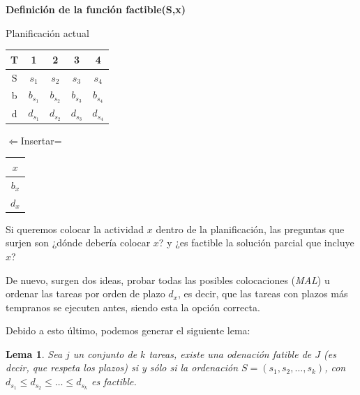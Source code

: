 \documentclass[10pt,a4paper,spanish]{report}
\newtheorem{lem}[thm]{Lema}
\theoremstyle{definition}
\theoremstyle{remark}
\begin{document}
\textbf{Definición de la función factible(S,x)}\\
\begin{minipage}{0.1\textwidth}
Planificación actual
\end{minipage}
\begin{minipage}{0.5\textwidth}
\begin{center}
    \begin{tabular}{|c|c|c|c|c|}
        \hline
        \rowcolor[rgb]{0.8,0.8,0.8}T & 1 & 2 & 3 & 4 \\
        \hline
        \cellcolor[rgb]{0.8,0.8,0.8}S & $s_1$ & $s_2$ & $s_3$ & $s_4$\\
        \hline
        \cellcolor[rgb]{0.9,0.9,0.9}b & $b_{s_1}$ & $b_{s_2}$ & $b_{s_3}$ & $b_{s_4}$\\
        \hline
        \cellcolor[rgb]{0.9,0.9,0.9}d & $d_{s_1}$ & $d_{s_2}$ & $d_{s_3}$ & $d_{s_4}$\\
        \hline
    \end{tabular}
\end{center}
\end{minipage}
\begin{minipage}{0.2\textwidth}
    $\Leftarrow$Insertar=
\end{minipage}
\begin{minipage}{0.2\textwidth}
    \begin{tabular}{|c|}
        \hline
        $x$\\
        \hline
        $b_x$\\
        \hline
        $d_x$\\
        \hline
    \end{tabular}
\end{minipage}

Si queremos colocar la actividad $x$ dentro de la planificación, las preguntas que surjen son ¿dónde debería colocar $x$? y ¿es factible la solución parcial que incluye $x$?

De nuevo, surgen dos ideas, probar todas las posibles colocaciones (\textit{MAL}) u ordenar las tareas por orden de plazo $d_x$, es decir, que las tareas con plazos más tempranos se ejecuten antes, siendo esta la opción correcta.

Debido a esto último, podemos generar el siguiente lema:
\begin{lem}
    Sea $j$ un conjunto de $k$ tareas, existe una odenación fatible de $J$ (es decir, que respeta los plazos) si y sólo si la ordenación $S=(s_1,s_2,\ldots,s_k)$, con $d_{s_1} \leq d_{s_2} \leq \ldots \leq d_{s_k}$ es factible.
\end{lem}
\end{document}
